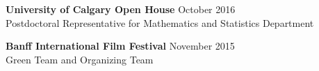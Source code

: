 \documentclass[margin,line,pifont,palatino,courier]{res}
\begin{document}
\begin{resume}
 

% 
\section{} 
	\Fields{\What\When\Where\Address}









\section{} 

\begin{description}
	\item \textbf{University of Calgary Open House} \hfill October 2016\\
		{\small Postdoctoral Representative for Mathematics and Statistics Department}
	
	\item \textbf{Banff International Film Festival} \hfill November 2015\\
		{\small Green Team and Organizing Team}
\end{description}


 
 
\newpage
\section{} 

\Fields{\Who\Link\Position\Where\Email\Phone\Relation\Photo\Comments}


\end{resume}
\end{document}
